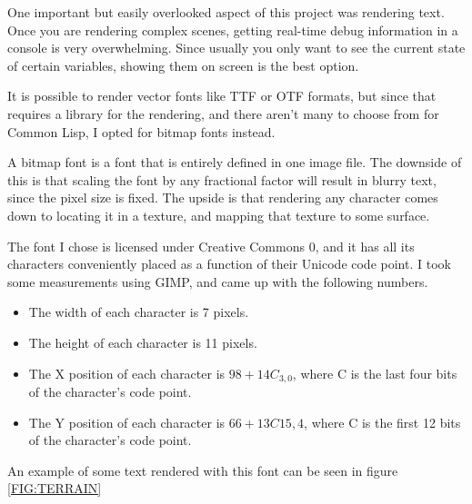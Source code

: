 

One important but easily overlooked aspect of this project was rendering text.
Once you are rendering complex scenes,
getting real-time debug information in a console is very overwhelming.
Since usually you only want to see the current state of certain variables,
showing them on screen is the best option.

It is possible to render vector fonts like TTF or OTF formats,
but since that requires a library for the rendering,
and there aren't many to choose from for Common Lisp,
I opted for bitmap fonts instead.

A bitmap font is a font that is entirely defined in one image file.
The downside of this is that scaling the font by any fractional factor will result in blurry text,
since the pixel size is fixed.
The upside is that rendering any character comes down to locating it in a texture,
and mapping that texture to some surface.

The font I chose is licensed under Creative Commons 0,
and it has all its characters conveniently placed as a function of their Unicode code point.
I took some measurements using GIMP,
and came up with the following numbers.

\begin{itemize}
\item The width of each character is 7 pixels.
\item The height of each character is 11 pixels.
\item The X position of each character is $98 + 14C_{3,0}$, where C is the last four bits of the character's code point.
\item The Y position of each character is $66 + 13C{15,4}$, where C is the first 12 bits of the character's code point.
\end{itemize}

An example of some text rendered with this font can be seen in figure \ref{FIG:TERRAIN}
